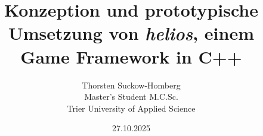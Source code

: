 \documentclass[peerreview]{IEEEtran}
\theoremstyle{definition} %
\begin{document}
\title{Konzeption und prototypische Umsetzung von \textit{helios}, einem Game Framework in C++}



\author{Thorsten Suckow-Homberg \\
Master's Student M.C.Sc.\\
Trier University of Applied Science
}
\date{27.10.2025}

\maketitle
\tableofcontents
\listoffigures
\listoftables

\IEEEpeerreviewmaketitle









\clearpage
\sloppy
\printbibliography
\fussy
\end{document}
